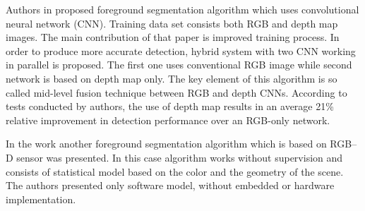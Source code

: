 \documentclass[b5paper,10pt,twoside]{article}
\begin{document}
{Authors in \cite{Hoffman_2016} proposed foreground segmentation algorithm which uses  convolutional neural network (CNN). Training data set consists both RGB and depth map images. The main contribution of that paper is improved training process. In order to produce more accurate detection, hybrid system with two CNN working in parallel is proposed. The first one uses conventional RGB image while second network is based on depth map only. The key element of this algorithm is so called mid-level fusion technique between RGB and depth CNNs. According to tests conducted by authors, the use of depth map results in an average 21\% relative improvement in detection performance over an RGB-only network.



In the work \cite{Hasnat_2014} another foreground segmentation algorithm which is based on RGB--D sensor was presented. In this case algorithm works without supervision and consists of statistical model based on the color and the geometry of the scene. The authors presented only software model, without embedded or hardware implementation.

}
\end{document}
